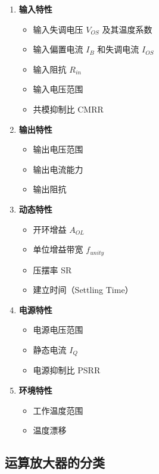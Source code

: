 \begin{enumerate}
  \item \textbf{输入特性}
    \begin{itemize}
      \item 输入失调电压 $V_{OS}$ 及其温度系数
      \item 输入偏置电流 $I_B$ 和失调电流 $I_{OS}$
      \item 输入阻抗 $R_{in}$
      \item 输入电压范围
      \item 共模抑制比 CMRR
    \end{itemize}

  \item \textbf{输出特性}
    \begin{itemize}
      \item 输出电压范围
      \item 输出电流能力
      \item 输出阻抗
    \end{itemize}

  \item \textbf{动态特性}
    \begin{itemize}
      \item 开环增益 $A_{OL}$
      \item 单位增益带宽 $f_{unity}$
      \item 压摆率 SR
      \item 建立时间（Settling Time）
    \end{itemize}

  \item \textbf{电源特性}
    \begin{itemize}
      \item 电源电压范围
      \item 静态电流 $I_Q$
      \item 电源抑制比 PSRR
    \end{itemize}

  \item \textbf{环境特性}
    \begin{itemize}
      \item 工作温度范围
      \item 温度漂移
    \end{itemize}
\end{enumerate}

\subsection{运算放大器的分类}

